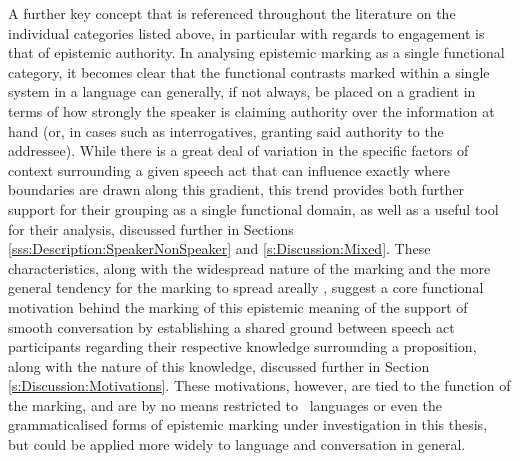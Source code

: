 A further key concept that is referenced throughout the literature on the individual categories listed above, in particular with regards to engagement \cite{EvansBergqvistSanRoque2018a} is that of epistemic authority. In analysing epistemic marking as a single functional category, it becomes clear that the functional contrasts marked within a single system in a language can generally, if not always, be placed on a gradient in terms of how strongly the speaker is claiming authority over the information at hand (or, in cases such as interrogatives, granting said authority to the addressee). While there is a great deal of variation in the specific factors of context surrounding a given speech act that can influence exactly where boundaries are drawn along this gradient, this trend provides both further support for their grouping as a single functional domain, as well as a useful tool for their analysis, discussed further in Sections \ref{sss:Description:SpeakerNonSpeaker} and \ref{s:Discussion:Mixed}. These characteristics, along with the widespread nature of the marking and the more general tendency for the marking to spread areally \cite{Aikhenvald2004}, suggest a core functional motivation behind the marking of this epistemic meaning of the support of smooth conversation by establishing a shared ground between speech act participants regarding their respective knowledge surrounding a proposition, along with the nature of this knowledge, discussed further in Section \ref{s:Discussion:Motivations}. These motivations, however, are tied to the function of the marking, and are by no means restricted to \lfam\ languages or even the grammaticalised forms of epistemic marking under investigation in this thesis, but could be applied more widely to language and conversation in general.

